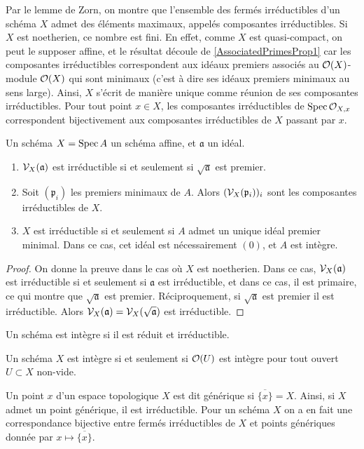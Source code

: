Par le lemme de Zorn, on montre que l'ensemble des fermés irréductibles d'un schéma $X$ admet des éléments maximaux, appelés composantes irréductibles. Si $X$ est noetherien, ce nombre est fini. En effet, comme $X$ est quasi-compact, on peut le supposer affine, et le résultat découle de \ref{AssociatedPrimesProp1} car les composantes irréductibles correspondent aux idéaux premiers associés au $\mathcal{O}(X)$-module $\mathcal{O}(X)$ qui sont minimaux (c'est à dire ses idéaux premiers minimaux au sens large). Ainsi, $X$ s'écrit de manière unique comme réunion de ses composantes irréductibles. Pour tout point $x\in X$, les composantes irréductibles de $\operatorname{Spec} \mathcal{O}_{X,x}$ correspondent bijectivement aux composantes irréductibles de $X$ passant par $x$.

\begin{prop}
Un schéma $X=\operatorname{Spec} A$ un schéma affine, et $\mathfrak{a}$ un idéal.
\begin{enumerate}
\item $\mathcal{V}_X(\mathfrak{a})$ est irréductible si et seulement si $\sqrt{\mathfrak{a}}$ est premier.
\item Soit $(\mathfrak{p}_i)$ les premiers minimaux de $A$. Alors $(\mathcal{V}_X(\mathfrak{p}_i))_i$ sont les composantes irréductibles de $X$.
\item $X$ est irréductible si et seulement si $A$ admet un unique idéal premier minimal. Dans ce cas, cet idéal est nécessairement $(0)$, et $A$ est intègre.
\end{enumerate}
\end{prop}
\begin{proof}
On donne la preuve dans le cas où $X$ est noetherien. Dans ce cas, $\mathcal{V}_X(\mathfrak{a})$ est irréductible si et seulement si $\mathfrak{a}$ est irréductible, et dans ce cas, il est primaire, ce qui montre que $\sqrt{\mathfrak{a}}$ est premier. Réciproquement, si $\sqrt{\mathfrak{a}}$ est premier il est irréductible. Alors $\mathcal{V}_X(\mathfrak{a})=\mathcal{V}_X(\sqrt{\mathfrak{a}})$ est irréductible.
\end{proof}

\begin{defn}
Un schéma est intègre si il est réduit et irréductible.
\end{defn}

\begin{prop}
Un schéma $X$ est intègre si et seulement si $\mathcal{O}(U)$ est intègre pour tout ouvert $U\subset X$ non-vide.
\end{prop}

Un point $x$ d'un espace topologique $X$ est dit générique si $\overline{\lbrace x\rbrace}=X$. Ainsi, si $X$ admet un point générique, il est irréductible. Pour un schéma $X$ on a en fait une correspondance bijective entre fermés irréductibles de $X$ et points génériques donnée par $x\mapsto \overline{\lbrace x\rbrace}$. 

